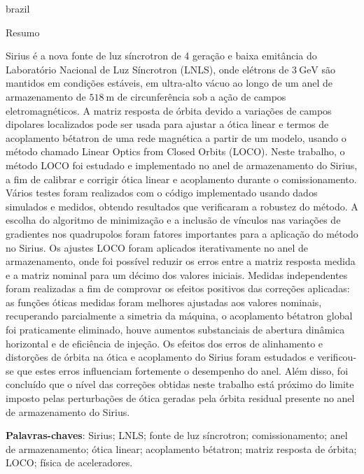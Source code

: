 \begin{otherlanguage*}{brazil}
\renewcommand{\sfdefault}{\rmdefault}
    \begin{center}{\ABNTEXchapterfont\huge Resumo}\end{center}
    
    Sirius é a nova fonte de luz síncrotron de 4 geração e baixa emitância do Laboratório Nacional de Luz Síncrotron (LNLS), onde elétrons de $\SI{3}{\giga\electronvolt}$ são mantidos em condições estáveis, em ultra-alto vácuo ao longo de um anel de armazenamento de $\SI{518}{\meter}$ de circunferência sob a ação de campos eletromagnéticos. A matriz resposta de órbita devido a variações de campos dipolares localizados pode ser usada para ajustar a ótica linear e termos de acoplamento bétatron de uma rede magnética a partir de um modelo, usando o método chamado Linear Optics from Closed Orbits (LOCO). Neste trabalho, o método LOCO foi estudado e implementado no anel de armazenamento do Sirius, a fim de calibrar e corrigir ótica linear e acoplamento durante o comissionamento. Vários testes foram realizados com o código implementado usando dados simulados e medidos, obtendo resultados que verificaram a robustez do método. A escolha do algoritmo de minimização e a inclusão de vínculos nas variações de gradientes nos quadrupolos foram fatores importantes para a aplicação do método no Sirius. Os ajustes LOCO foram aplicados iterativamente no anel de armazenamento, onde foi possível reduzir os erros entre a matriz resposta medida e a matriz nominal para um décimo dos valores iniciais. Medidas independentes foram realizadas a fim de comprovar os efeitos positivos das correções aplicadas: as funções óticas medidas foram melhores ajustadas aos valores nominais, recuperando parcialmente a simetria da máquina, o acoplamento bétatron global foi praticamente eliminado, houve aumentos substanciais de abertura dinâmica horizontal e de eficiência de injeção. Os efeitos dos erros de alinhamento e distorções de órbita na ótica e acoplamento do Sirius foram estudados e verificou-se que estes erros influenciam fortemente o desempenho do anel. Além disso, foi concluído que o nível das correções obtidas neste trabalho está próximo do limite imposto pelas perturbações de ótica geradas pela órbita residual presente no anel de armazenamento do Sirius.
    
    \vspace{\onelineskip}
    \noindent\textbf{Palavras-chaves}: Sirius; LNLS; fonte de luz síncrotron; comissionamento; anel de armazenamento; ótica linear; acoplamento bétatron; matriz resposta de órbita; LOCO; física de aceleradores.
    \vspace{\fill}
\end{otherlanguage*}
\cleardoublepage

